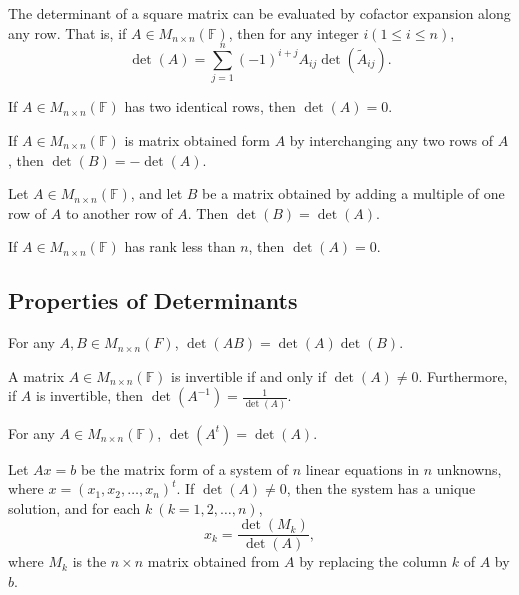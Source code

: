 \newpage
\begin{theorem}
    The determinant of a square matrix can be evaluated by cofactor expansion along any row. That is, if \( A \in M_{n \times n}(\mathbb{F}) \), then for any integer \( i(1 \leq i \leq n ) \),
    \[
    \det (A) = \sum_{j=1}^{n} (-1)^{i+j} A_{ij} \det (\tilde{A}_{ij}).
    \]
\end{theorem}
\vspace{3cm}
\begin{corollary}
    If \( A \in M_{n \times n}(\mathbb{F}) \) has two identical rows, then \(\det (A) = 0\).
\end{corollary}
\vspace{5cm}
\begin{theorem}
    If \( A \in M_{n \times n}(\mathbb{F}) \) is matrix obtained form \(A\) by interchanging any two rows of \(A\), then \(\det (B) = - \det (A)\).
\end{theorem}
\newpage
\begin{theorem}
    Let \( A \in M_{n \times n}(\mathbb{F}) \), and let \( B \) be a matrix obtained by adding a multiple of one row of \(A\) to another row of \(A\). Then \(\det (B) = \det (A)\).
\end{theorem}
\vspace{3cm}
\begin{corollary}
    If \( A \in M_{n \times n}(\mathbb{F}) \) has rank less than \(n\), then \(\det (A) = 0\).
\end{corollary}
\vspace{3cm}
\subsection{Properties of Determinants}
\begin{theorem}
    For any \(A,B \in M_{n \times n}(F)\), \( \det (AB) = \det (A) \det (B) \).
\end{theorem}
\newpage
\begin{corollary}
    A matrix \(A \in M_{n \times n}(\mathbb{F})\) is invertible if and only if \(\det (A) \neq 0\).
    Furthermore, if \(A\) is invertible, then \(\det (A^{-1}) = \frac{1}{\det (A)}\).
\end{corollary}
\vspace{3cm}
\begin{theorem}
    For any \(A \in M_{n \times n}(\mathbb{F})\), \(\det (A^t) = \det (A)\).
\end{theorem}
\vspace{5cm}
\begin{theorem}
    Let \( Ax = b\) be the matrix form of a system of \( n\) linear equations in \( n \) unknowns, where \( x = (x_1, x_2, \dots , x_n)^t \).
    If \(\det (A) \neq 0\), then the system has a unique solution, and for each \(k\ (k = 1, 2, \dots , n)\),
    \[
    x_k = \frac{\det (M_k)}{\det (A)},
    \]
    where \(M_k\) is the \(n \times n \) matrix obtained from \(A\) by replacing the column \(k\) of \(A\) by \(b\).
\end{theorem}
\vspace{5cm}
